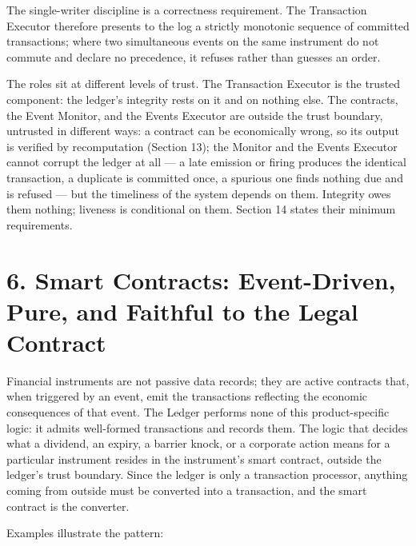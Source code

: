 \documentclass[11pt,a4paper]{article}
\newcommand{\clabel}[1]{\leavevmode\hypertarget{clause-#1}{}%
  \marginpar{\raggedright\scriptsize\ttfamily\textcolor{gray}{#1}}}
\begin{document}
\clabel{C-5.7}The single-writer discipline is a correctness requirement. The
Transaction Executor therefore presents to the log a strictly monotonic
sequence of committed transactions; where two simultaneous events on the
same instrument do not commute and declare no precedence, it refuses
rather than guesses an order.

\clabel{C-5.8}The roles sit at different levels of trust. The Transaction Executor is
the trusted component: the ledger's integrity rests on it and on nothing
else. The contracts, the Event Monitor, and the Events Executor are
outside the trust boundary, untrusted in different ways: a contract can
be economically wrong, so its output is verified by recomputation
(Section 13); the Monitor and the Events Executor cannot corrupt the
ledger at all --- a late emission or firing produces the identical
transaction, a duplicate is committed once, a spurious one finds nothing
due and is refused --- but the timeliness of the system depends on them.
Integrity owes them nothing; liveness is conditional on them. Section 14
states their minimum requirements.

\hypertarget{smart-contracts-event-driven-pure-and-faithful-to-the-legal-contract}{%
\section{6. Smart Contracts: Event-Driven, Pure, and Faithful to the
Legal
Contract}\label{smart-contracts-event-driven-pure-and-faithful-to-the-legal-contract}}

\clabel{C-6.1}Financial instruments are not passive data records; they are active
contracts that, when triggered by an event, emit the transactions
reflecting the economic consequences of that event. The Ledger performs
none of this product-specific logic: it admits well-formed transactions
and records them. The logic that decides what a dividend, an expiry, a
barrier knock, or a corporate action means for a particular instrument
resides in the instrument's smart contract, outside the ledger's trust
boundary. Since the ledger is only a transaction processor, anything
coming from outside must be converted into a transaction, and the smart
contract is the converter.

Examples illustrate the pattern:
\end{document}
